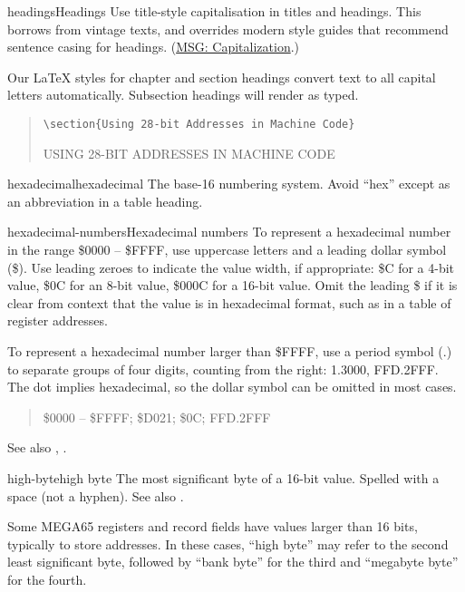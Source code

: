 \begin{sgentry}{headings}{Headings}
    Use title-style capitalisation in titles and headings. This borrows from vintage texts, and overrides modern style guides that recommend sentence casing for headings. (\href{https://learn.microsoft.com/en-us/style-guide/capitalization}{MSG: Capitalization}.)

    Our LaTeX styles for chapter and section headings convert text to all capital letters automatically. Subsection headings will render as typed.

    \begin{quote}
        \texttt{{\textbackslash}section\{Using 28-bit Addresses in Machine Code\}}

        \hrulefill

        {\large USING 28-BIT ADDRESSES IN MACHINE CODE}
    \end{quote}
\end{sgentry}

\begin{sgentry}{hexadecimal}{hexadecimal}
    The base-16 numbering system. Avoid ``hex'' except as an abbreviation in a table heading.
\end{sgentry}

\begin{sgentry}{hexadecimal-numbers}{Hexadecimal numbers}
    To represent a hexadecimal number in the range \$0000 -- \$FFFF, use uppercase letters and a leading dollar symbol (\$). Use leading zeroes to indicate the value width, if appropriate: \$C for a 4-bit value, \$0C for an 8-bit value, \$000C for a 16-bit value. Omit the leading \$ if it is clear from context that the value is in hexadecimal format, such as in a table of register addresses.

    To represent a hexadecimal number larger than \$FFFF, use a period symbol (.) to separate groups of four digits, counting from the right: 1.3000, FFD.2FFF. The dot implies hexadecimal, so the dollar symbol can be omitted in most cases.

    \begin{quote}
        \$0000 -- \$FFFF; \$D021; \$0C; FFD.2FFF
    \end{quote}

    See also , .
\end{sgentry}

\begin{sgentry}{high-byte}{high byte}
    The most significant byte of a 16-bit value. Spelled with a space (not a hyphen). See also .

    Some MEGA65 registers and record fields have values larger than 16 bits, typically to store addresses. In these cases, ``high byte'' may refer to the second least significant byte, followed by ``bank byte'' for the third and ``megabyte byte'' for the fourth.
\end{sgentry}

